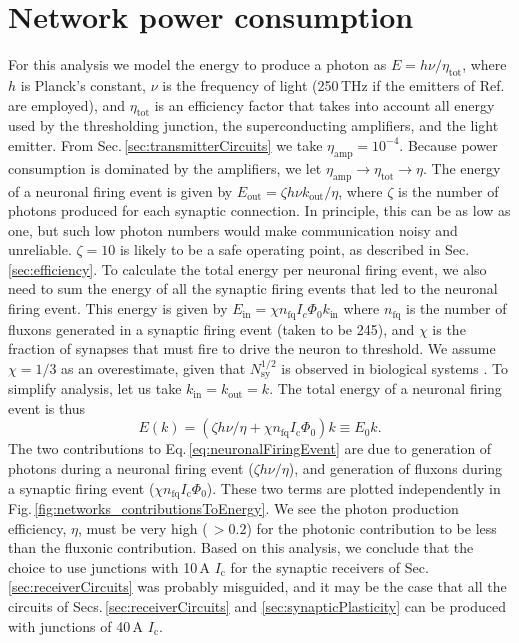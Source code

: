 \documentclass[aip,amsmath,amssymb,reprint,nofootinbib]{revtex4-1}
\begin{document}
\section{\label{apx:power}Network power consumption}	
For this analysis we model the energy to produce a photon as $E = h\nu/\eta_{\mathrm{tot}}$, where $h$ is Planck's constant, $\nu$ is the frequency of light (250\,THz if the emitters of Ref.\, are employed), and $\eta_{\mathrm{tot}}$ is an efficiency factor that takes into account all energy used by the thresholding junction, the superconducting amplifiers, and the light emitter. From Sec.\,\ref{sec:transmitterCircuits} we take $\eta_{\mathrm{amp}} = 10^{-4}$. Because power consumption is dominated by the amplifiers, we let $\eta_{\mathrm{amp}}\rightarrow\eta_{\mathrm{tot}}\rightarrow\eta$. The energy of a neuronal firing event is given by $E_{\mathrm{out}} = \zeta h \nu k_{\mathrm{out}}/\eta$, where $\zeta$ is the number of photons produced for each synaptic connection. In principle, this can be as low as one, but such low photon numbers would make communication noisy and unreliable. $\zeta = 10$ is likely to be a safe operating point, as described in Sec.\,\ref{sec:efficiency}. To calculate the total energy per neuronal firing event, we also need to sum the energy of all the synaptic firing events that led to the neuronal firing event. This energy is given by $E_{\mathrm{in}} = \chi n_{\mathrm{fq}} I_c \Phi_0 k_{\mathrm{in}}$ where $n_{\mathrm{fq}}$ is the number of fluxons generated in a synaptic firing event (taken to be 245), and $\chi$ is the fraction of synapses that must fire to drive the neuron to threshold. We assume $\chi = 1/3$ as an overestimate, given that $N_{\mathrm{sy}}^{1/2}$ is observed in biological systems \cite{vrso1996,vora2005}. To simplify analysis, let us take $k_{\mathrm{in}} = k_{\mathrm{out}} = k$. The total energy of a neuronal firing event is thus
\begin{equation}
\label{eq:neuronalFiringEvent}
E(k) = (\zeta h \nu/\eta + \chi n_{\mathrm{fq}} I_{\mathrm{c}} \Phi_0) k\equiv E_0 k.
\end{equation}
The two contributions to Eq.\,\ref{eq:neuronalFiringEvent} are due to generation of photons during a neuronal firing event ($\zeta h \nu/\eta$), and generation of fluxons during a synaptic firing event ($\chi n_{\mathrm{fq}} I_{\mathrm{c}} \Phi_0$). These two terms are plotted independently in Fig.\,\ref{fig:networks_contributionsToEnergy}. We see the photon production efficiency, $\eta$, must be very high (\,$>0.2$) for the photonic contribution to be less than the fluxonic contribution. Based on this analysis, we conclude that the choice to use junctions with 10\,\textmu A $I_{\mathrm{c}}$ for the synaptic receivers of Sec.\,\ref{sec:receiverCircuits} was probably misguided, and it may be the case that all the circuits of Secs.\,\ref{sec:receiverCircuits} and \ref{sec:synapticPlasticity} can be produced with junctions of 40\,\textmu A $I_{\mathrm{c}}$. 
\end{document}
